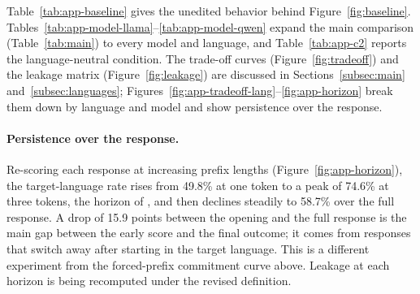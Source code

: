 Table~\ref{tab:app-baseline} gives the unedited behavior behind Figure~\ref{fig:baseline}. Tables~\ref{tab:app-model-llama}--\ref{tab:app-model-qwen} expand the main comparison (Table~\ref{tab:main}) to every model and language, and Table~\ref{tab:app-c2} reports the language-neutral condition. The trade-off curves (Figure~\ref{fig:tradeoff}) and the leakage matrix (Figure~\ref{fig:leakage}) are discussed in Sections~\ref{subsec:main} and~\ref{subsec:languages}; Figures~\ref{fig:app-tradeoff-lang}--\ref{fig:app-horizon} break them down by language and model and show persistence over the response.

\paragraph{Persistence over the response.} Re-scoring each \foxp response at increasing prefix lengths (Figure~\ref{fig:app-horizon}), the target-language rate rises from 49.8\% at one token to a peak of 74.6\% at three tokens, the horizon of \dM, and then declines steadily to 58.7\% over the full response. A drop of 15.9 points between the opening and the full response is the main gap between the early score and the final outcome; it comes from responses that switch away after starting in the target language. This is a different experiment from the forced-prefix commitment curve above. Leakage at each horizon is being recomputed under the revised definition.

